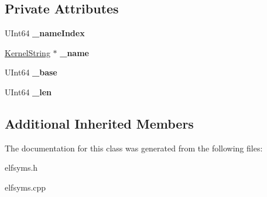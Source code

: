 \subsection*{Private Attributes}
\begin{DoxyCompactItemize}
\item 
\mbox{\label{class_elf_symbols_1_1_symbol_a30e9b56eff4a1ddd1b0c5e1fc61da748}} 
U\+Int64 {\bfseries \+\_\+name\+Index}
\item 
\mbox{\label{class_elf_symbols_1_1_symbol_aa83884a01c904b0a0d9240430f8bc5b2}} 
\hyperlink{class_kernel_string}{Kernel\+String} $\ast$ {\bfseries \+\_\+name}
\item 
\mbox{\label{class_elf_symbols_1_1_symbol_aae16b45a18064f02fab405b69964922d}} 
U\+Int64 {\bfseries \+\_\+base}
\item 
\mbox{\label{class_elf_symbols_1_1_symbol_ae4d0df6b0a6f2add5a6fcf2b2b35506b}} 
U\+Int64 {\bfseries \+\_\+len}
\end{DoxyCompactItemize}
\subsection*{Additional Inherited Members}


The documentation for this class was generated from the following files\+:\begin{DoxyCompactItemize}
\item 
elfsyms.\+h\item 
elfsyms.\+cpp\end{DoxyCompactItemize}
